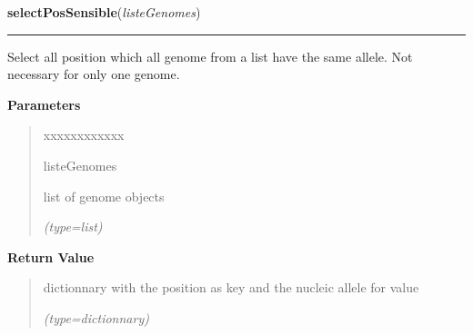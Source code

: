 \hspace{.8\funcindent}\begin{boxedminipage}{\funcwidth}

    \raggedright \textbf{selectPosSensible}(\textit{listeGenomes})

    \vspace{-1.5ex}

    \rule{\textwidth}{0.5\fboxrule}
\setlength{\parskip}{2ex}
    Select all position which all genome from a list have the same allele. 
    Not necessary for only one genome.

\setlength{\parskip}{1ex}
      \textbf{Parameters}
      \vspace{-1ex}

      \begin{quote}
        \begin{Ventry}{xxxxxxxxxxxx}

          \item[listeGenomes]

          list of genome objects

            {\it (type=list)}

        \end{Ventry}

      \end{quote}

      \textbf{Return Value}
    \vspace{-1ex}

      \begin{quote}
      dictionnary with the position as key and the nucleic allele for value

      {\it (type=dictionnary)}

      \end{quote}

    \end{boxedminipage}

    \label{script-phyloFixedVar:genomeName_to_genomeObjet}

    \vspace{0.5ex}

